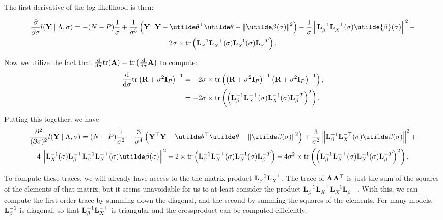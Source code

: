 \documentclass[10pt]{article}
\begin{document}
The first derivative of the log-likelihood is then:

\begin{multline*}
\frac{\partial}{\partial\sigma} l({\bf Y} \mid \Lambda,
\sigma ) = -(N-P)\frac{1}{\sigma} + \frac{1}{\sigma^3}\left({\bf Y}^\top{\bf
    Y}-\utilde\theta^\top\utilde\theta
  -\left\|\utilde\beta(\sigma)\right\|^2\right) -
\frac{1}{\sigma}\left\|{\bf L}_\beta^{-1}{\bf
  L}_X^{-\top}(\sigma)\utilde{\beta}(\sigma) \right\|^2 - \\
2\sigma\times\mathrm{tr}\left({\bf
    L}_\beta^{-1}{\bf L}_X^{-\top}(\sigma){\bf L}_X^{-1}(\sigma){\bf L}_\beta^{-T}\right).
\end{multline*}

Now we utilize the fact that
$\frac{\mathrm{d}}{\mathrm{d}\sigma}\mathrm{tr}({\bf A}) =
\mathrm{tr}\left(\frac{\mathrm{d}}{\mathrm{d}\sigma} {\bf A}\right)$
to compute:
\begin{align*}
\frac{\mathrm{d}}{\mathrm{d}\sigma}\mathrm{tr} \left({\bf
    R}+\sigma^2{\bf I}_P\right)^{-1}  & =
-2\sigma\times\mathrm{tr} \left(\left({\bf R}+\sigma^2{\bf I}_P\right)^{-1}\left({\bf
      R}+\sigma^2{\bf I}_P\right)^{-1} \right), \\
& = -2\sigma\times\mathrm{tr} \left( \left({\bf
    L}_\beta^{-1}{\bf L}_X^{-\top}(\sigma){\bf L}_X^{-1}(\sigma){\bf
    L}_\beta^{-T} \right)^2  \right).
\end{align*}

Putting this together, we have
\begin{multline*}
\frac{\partial^2}{(\partial\sigma)^2} l({\bf Y} \mid \Lambda,
\sigma ) = (N - P) \frac{1}{\sigma^2} - \frac{3}{\sigma^4} \left({\bf Y}^\top{\bf
    Y}-\utilde\theta^\top\utilde\theta
  -\left\|\utilde\beta(\sigma)\right\|^2\right) +
\frac{3}{\sigma^2}\left\| {\bf L}_\beta^{-1}{\bf
    L}_X^{-\top}(\sigma)\utilde\beta(\sigma) \right\|^2 + \\
4\left\| {\bf L}_X^{-1}(\sigma){\bf L}_\beta^{-\top} {\bf L}_\beta^{-1}{\bf
    L}_X^{-\top}(\sigma)\utilde\beta(\sigma) \right\|^2 -
2\times\mathrm{tr}\left({\bf
    L}_\beta^{-1}{\bf L}_X^{-\top}(\sigma){\bf L}_X^{-1}(\sigma){\bf
    L}_\beta^{-T}\right) + 4\sigma^2\times\mathrm{tr}\left( \left( {\bf
    L}_\beta^{-1}{\bf L}_X^{-\top}(\sigma){\bf L}_X^{-1}(\sigma){\bf L}_\beta^{-T}\right)^2 \right).
\end{multline*}

To compute these traces, we will already have access to the the matrix
product ${\bf L}_\beta^{-1}{\bf L}_X^{-\top}$. The trace of ${\bf
  A}{\bf A}^\top$ is just the sum of the squares of the elements of
that matrix, but it seems unavoidable for us to at least consider the
product ${\bf L}_\beta^{-1}{\bf L}_X^{-\top}{\bf L}_X^{-1}{\bf
  L}_\beta^{-\top}$. With this, we can compute the first order trace
by summing down the diagonal, and the second by summing the squares of
the elements. For many models, ${\bf L}_\beta^{-1}$ is diagonal, so
that ${\bf L}_\beta^{-1}{\bf L}_X^{-\top}$ is triangular and the
crossproduct can be computed efficiently.
\end{document}
